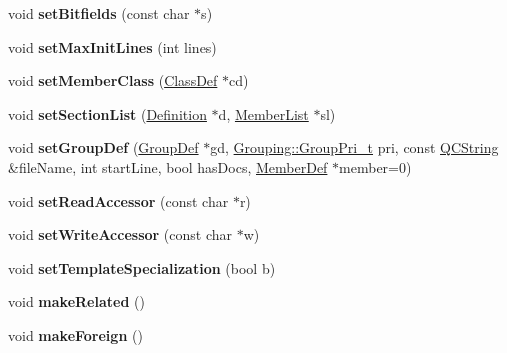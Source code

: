 \begin{DoxyCompactItemize}
void {\bfseries set\+Bitfields} (const char $\ast$s)
\item 
\mbox{\label{class_member_def_a751151962227b4d03dacef605134244a}} 
void {\bfseries set\+Max\+Init\+Lines} (int lines)
\item 
\mbox{\label{class_member_def_af09c449c41978bfef628cb7cbfe47846}} 
void {\bfseries set\+Member\+Class} (\mbox{\hyperlink{class_class_def}{Class\+Def}} $\ast$cd)
\item 
\mbox{\label{class_member_def_ac17cfa09998e5486dcfcf12d4cd84216}} 
void {\bfseries set\+Section\+List} (\mbox{\hyperlink{class_definition}{Definition}} $\ast$d, \mbox{\hyperlink{class_member_list}{Member\+List}} $\ast$sl)
\item 
\mbox{\label{class_member_def_a81ef66839371bde9adeae597316c0e24}} 
void {\bfseries set\+Group\+Def} (\mbox{\hyperlink{class_group_def}{Group\+Def}} $\ast$gd, \mbox{\hyperlink{struct_grouping_a9f0ec5ab376b083ebe3274ea79fd2d70}{Grouping\+::\+Group\+Pri\+\_\+t}} pri, const \mbox{\hyperlink{class_q_c_string}{Q\+C\+String}} \&file\+Name, int start\+Line, bool has\+Docs, \mbox{\hyperlink{class_member_def}{Member\+Def}} $\ast$member=0)
\item 
\mbox{\label{class_member_def_a8eb657e57a9c7ec2e002527beae6eb7d}} 
void {\bfseries set\+Read\+Accessor} (const char $\ast$r)
\item 
\mbox{\label{class_member_def_ac9faa4b8dbe3973d98885e92b6d9481f}} 
void {\bfseries set\+Write\+Accessor} (const char $\ast$w)
\item 
\mbox{\label{class_member_def_acfbb6c95a95244ad51c79f2921e359fb}} 
void {\bfseries set\+Template\+Specialization} (bool b)
\item 
\mbox{\label{class_member_def_a1c119ec90a4e57712f35eb30173c83c9}} 
void {\bfseries make\+Related} ()
\item 
\mbox{\label{class_member_def_a17267c1090bb5b89524750dcba663fbf}} 
void {\bfseries make\+Foreign} ()
\item 

\end{DoxyCompactItemize}
